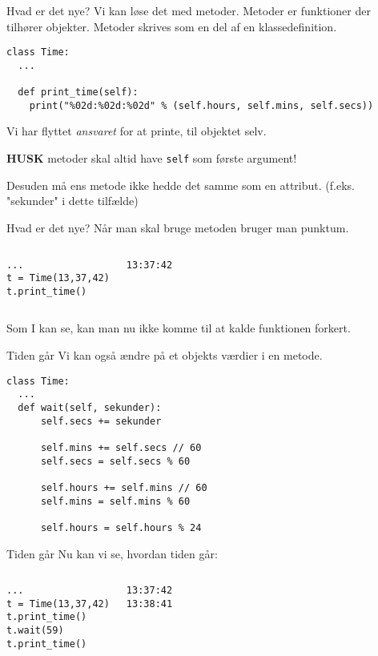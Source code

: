 \documentclass[main.tex]{subfiles}
\begin{document}
\begin{frame}[fragile]{Hvad er det nye?}
Vi kan løse det med metoder. Metoder er funktioner der tilhører objekter. Metoder skrives som en del af en klassedefinition.
\begin{lstlisting}[style=python]
class Time:
  ...

  def print_time(self):
    print("%02d:%02d:%02d" % (self.hours, self.mins, self.secs))
\end{lstlisting}
\pause
Vi har flyttet \textit{ansvaret} for at printe, til objektet selv.

\textbf{HUSK} metoder skal altid have \texttt{self} som første argument!

Desuden må ens metode ikke hedde det samme som en attribut. (f.eks. "sekunder" i dette tilfælde)
\end{frame}

\begin{frame}[fragile]{Hvad er det nye?}
Når man skal bruge metoden bruger man punktum.
\begin{columns}
\begin{lstlisting}[style=python]
...
t = Time(13,37,42)
t.print_time()
\end{lstlisting}
\pause
{}
\begin{lstlisting}[style=python]
13:37:42
\end{lstlisting}
\end{columns}
\pause
Som I kan se, kan man nu ikke komme til at kalde funktionen forkert.
\end{frame}


\begin{frame}[fragile]{Tiden går}
Vi kan også ændre på et objekts værdier i en metode.
\begin{lstlisting}[style=python]
class Time:
  ...
  def wait(self, sekunder):
	  self.secs += sekunder
	  
	  self.mins += self.secs // 60
	  self.secs = self.secs % 60
	  
	  self.hours += self.mins // 60
	  self.mins = self.mins % 60
	  
	  self.hours = self.hours % 24
\end{lstlisting}
\end{frame}


\begin{frame}[fragile]{Tiden går}
Nu kan vi se, hvordan tiden går:
\begin{columns}
\begin{lstlisting}[style=python]
...
t = Time(13,37,42)
t.print_time()
t.wait(59)
t.print_time()
\end{lstlisting}
\pause
{}
\begin{lstlisting}[style=python]
13:37:42
13:38:41
\end{lstlisting}
\end{columns}
\end{frame}
\end{document}
